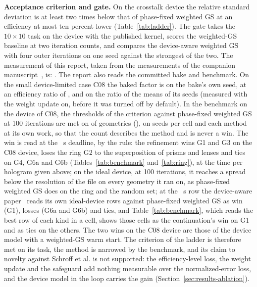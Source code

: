 \textbf{Acceptance criterion and gate.} On the crosstalk device the relative standard deviation is at least two times below that of phase-fixed weighted GS at an efficiency at most ten percent lower (Table~\ref{tab:ladder}). The gate takes the $10\times10$ task on the device with the published kernel, scores the weighted-GS baseline at two iteration counts, and compares the device-aware weighted GS with four outer iterations on one seed against the strongest of the two. The measurement of this report, taken from the measurements of the companion manuscript~\cite{companion}, is: . The report also reads the committed bake and benchmark. On the small device-limited case C08 the baked factor is \bakeCeightRatio{} on the bake's own seed, at an efficiency ratio of \bakeCeightEffRatio{}, and \bakeCeightRatioThree{} on the ratio of the means of its \bakeCeightSeedsN{} seeds (measured with the weight update on, before it was turned off by default). In the benchmark on the device of C08, the thresholds of the criterion against phase-fixed weighted GS at 100 iterations are met on \benchOnePass{} of \benchOneN{} geometries (\benchOnePassList), on \benchSeedsMin{} seeds per cell and each method at its own work, so that the count describes the method and is never a win. The win is read at the \dlReadS{}~s deadline, by the rule: the refinement wins G1 and G3 on the C08 device, loses the ring G2 to the superposition of prisms and lenses and ties on G4, G6a and G6b (Tables~\ref{tab:benchmark} and~\ref{tab:ring}), at the time per hologram given above; on the ideal device, at 100 iterations, it reaches a spread below the resolution of the file on every geometry it ran on, as phase-fixed weighted GS does on the ring and the random set; at the \dlReadS{}~s row the device-aware paper~\cite{companion} reads its own ideal-device rows against phase-fixed weighted GS as  win (G1),  losses (G6a and G6b) and  ties, and Table~\ref{tab:benchmark}, which reads the best row of each kind in a cell, shows those cells as the continuation's win on G1 and as ties on the others. The two wins on the C08 device are those of the device model with a weighted-GS warm start. The criterion of the ladder is therefore met on its task, the method is narrowed by the benchmark, and its claim to novelty against Schroff et al. is not supported: the efficiency-level loss, the weight update and the safeguard add nothing measurable over the normalized-error loss, and the device model in the loop carries the gain (Section~\ref{sec:results-ablation}).

